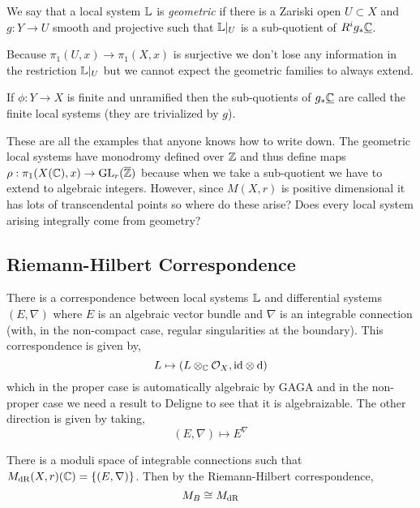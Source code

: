 \documentclass[12pt]{article}
\begin{document}
\begin{defn}
We say that a local system $\mathbb{L}$ is \textit{geometric} if there is a Zariski open $U \subset X$ and $g : Y \to U$ smooth and projective such that $\mathbb{L}|_U$ is a sub-quotient of $R^i g_* \underline{\mathbb{C}}$.
\end{defn}

\begin{rmk}
Because $\pi_1(U, x) \to \pi_1(X, x)$ is surjective we don't lose any information in the restriction $\mathbb{L}|_U$ but we cannot expect the geometric families to always extend. 
\end{rmk}

\begin{rmk}
If $\phi  : Y \to X$ is finite and unramified then the sub-quotients of $g_* \underline{\mathbb{C}}$ are called the finite local systems (they are trivialized by $g$). 
\end{rmk}

These are all the examples that anyone knows how to write down. The geometric local systems have monodromy defined over $\mathbb{Z}$ and thus define maps $\rho : \pi_1(X(\mathbb{C}), x) \to \mathrm{GL}_r(\overline{\mathbb{Z}})$ because when we take a sub-quotient we have to extend to algebraic integers. However, since $M(X, r)$ is positive dimensional it has lots of transcendental points so where do these arise? Does every local system arising integrally come from geometry? 

\subsection{Riemann-Hilbert Correspondence}

There is a correspondence between local systems $\mathbb{L}$ and differential systems $(E, \nabla)$ where $E$ is an algebraic vector bundle and $\nabla$ is an integrable connection (with, in the non-compact case, regular singularities at the boundary). This correspondence is given by,
\[ L \mapsto (L \otimes_{\mathbb{C}} \mathcal{O}_{X}, \mathrm{id} \otimes \mathrm{d}{}) \]
which in the proper case is automatically algebraic by GAGA and in the non-proper case we need a result to Deligne to see that it is algebraizable. The other direction is given by taking,
\[ (E, \nabla) \mapsto E^{\nabla} \]

\begin{prop}
There is a moduli space of integrable connections such that $M_{\mathrm{dR}}(X, r)(\mathbb{C}) = \{ (E, \nabla) \} $. Then by the Riemann-Hilbert correspondence, \[ M_B \cong M_{\mathrm{dR}} \]
\end{prop}
\end{document}
